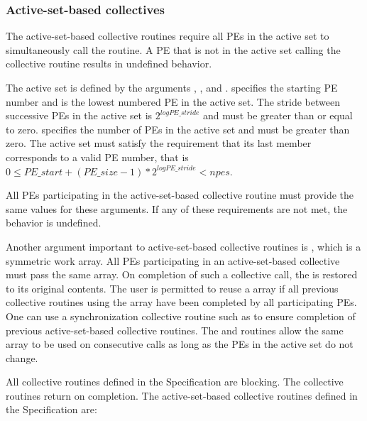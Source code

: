 \begin{DeprecateBlock}

\subsubsection*{Active-set-based collectives}

The active-set-based collective routines require all \acp{PE}
in the active set to simultaneously call the
routine.  A \ac{PE} that is not in the active set calling the collective
routine results in undefined behavior.

The active set is defined by the arguments , ,
and .   specifies the starting \ac{PE} number and
is the lowest numbered \ac{PE} in the active set.  The stride between successive
\acp{PE} in the active set is $2^{logPE\_stride}$ and  must
be greater than or equal to zero.   specifies the number of
\acp{PE} in the active set and must be greater than zero.  The active set must
satisfy the requirement that its last member corresponds to a valid \ac{PE}
number, that is
$0 \le PE\_start + (PE\_size - 1) * 2^{logPE\_stride} < npes$.

All \acp{PE} participating in the active-set-based collective routine must provide the same
values for these arguments.  If any of these requirements are not met, the
behavior is undefined.

Another argument important to active-set-based collective routines is , which is a
symmetric work array.  All \acp{PE} participating in an active-set-based collective must pass the
same  array.  On completion of such a collective call, the  is
restored to its original contents.  The user is permitted to reuse a 
array if all previous collective routines using the  array have been
completed by all participating \acp{PE}. One can use a synchronization
collective routine such as  to ensure completion of previous active-set-based collective
routines. The  and  routines allow the same
 array to be used on consecutive calls as long as the \acp{PE}
in the active set do not change.

All collective routines defined in the Specification are blocking.  The
collective routines return on completion.  The active-set-based collective
routines defined in the \openshmem Specification are:


\end{DeprecateBlock}
